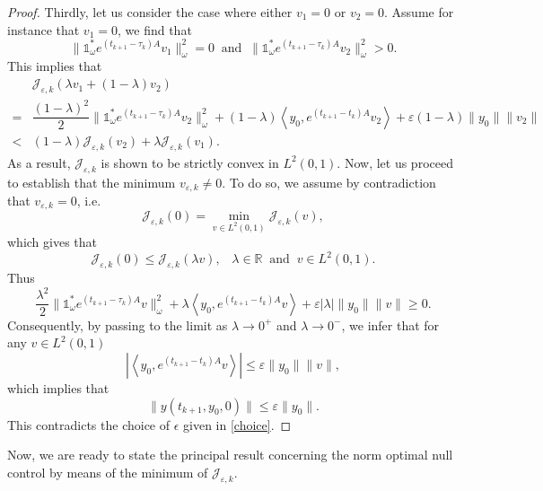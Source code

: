 \documentclass[sn-mathphys]{sn-jnl}
\begin{document}
\begin{proof}
    Thirdly, let us consider the case where either \(v_1=0\) or \(v_2=0\). Assume for instance that \(v_1=0\), we find that 
    \[\|\mathds{1}_{\omega}^{*} e^{(t_{k+1}-\tau_k)A} v_1 \|_{\omega}^2 =0 \;\;\text{and}\;\; \|\mathds{1}_{\omega}^{*} e^{(t_{k+1}-\tau_k)A} v_2 \|_{\omega}^2 >0.\]
    This implies that
    \begin{align}\label{ineq8}
        &\mathcal{J}_{\varepsilon,k}(\lambda v_1 + (1-\lambda) v_2)\nonumber\\
        = &\dfrac{(1-\lambda)^2}{2} \|\mathds{1}_{\omega}^{*} e^{(t_{k+1}-\tau_k)A} v_2 \|_{\omega}^2 + (1-\lambda) \left\langle y_0, e^{(t_{k+1}-t_k)A} v_2 \right\rangle + \varepsilon (1-\lambda) \|y_0\|\|v_2\|\nonumber\\
        < &(1-\lambda) \mathcal{J}_{\varepsilon,k}(v_2) + \lambda \mathcal{J}_{\varepsilon,k}(v_1).
    \end{align}
    As a result, \(\mathcal{J}_{\varepsilon,k}\) is shown to be strictly convex in $L^2(0,1)$. Now, let us proceed to establish that the minimum $v_{\varepsilon,k} \neq 0$. To do so, we assume by contradiction that $v_{\varepsilon,k}=0$, i.e.
    \[\mathcal{J}_{\varepsilon,k}(0)= \min_{v \in L^2(0,1)} \mathcal{J}_{\varepsilon,k}(v),\]
    which gives that
    \[\mathcal{J}_{\varepsilon,k}(0) \leq \mathcal{J}_{\varepsilon,k}( \lambda v), \;\;\; \lambda \in \mathbb{R}\;\; \text{and}\;\; v \in L^2(0,1).\]
    Thus
    \[\dfrac{\lambda^2}{2} \|\mathds{1}_{\omega}^{*} e^{(t_{k+1}-\tau_k)A} v\|^2_{\omega} + \lambda \left\langle y_0, e^{(t_{k+1}-t_k)A} v \right\rangle + \varepsilon \left\lvert \lambda \right\rvert \|y_0\|\|v\| \geq 0.\]
    Consequently, by passing to the limit as $\lambda \to 0^{+}$ and $\lambda \to 0^{-}$, we infer that for any $v \in L^2(0,1)$
    \[\left\lvert \left\langle y_0, e^{(t_{k+1}-t_k)A} v \right\rangle \right\rvert \leq \varepsilon \|y_0\|\|v\|,\]
    which implies that
    \begin{equation}
        \|y(t_{k+1},y_0,0)\| \leq \varepsilon \|y_0\|.
    \end{equation}
    This contradicts the choice of $\epsilon$ given in \eqref{choice}.
\end{proof}
Now, we are ready to state the principal result concerning the norm optimal null control by means of the minimum of \(\mathcal{J}_{\varepsilon,k}\).
\end{document}
